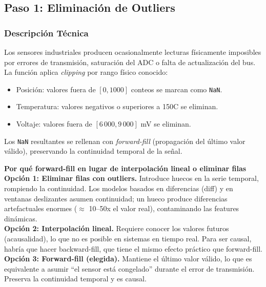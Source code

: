 \documentclass[12pt,a4paper]{article}
\begin{document}
\subsection{Paso 1: Eliminaci\'{o}n de Outliers}

\subsubsection{Descripci\'{o}n T\'{e}cnica}

Los sensores industriales producen ocasionalmente lecturas f\'{i}sicamente imposibles
por errores de transmisi\'{o}n, saturaci\'{o}n del ADC o falta de actualizaci\'{o}n del bus.
La funci\'{o}n aplica \textit{clipping} por rango f\'{i}sico conocido:
\begin{itemize}[itemsep=2pt]
  \item Posici\'{o}n: valores fuera de $[0, 1000]$ conteos se marcan como \texttt{NaN}.
  \item Temperatura: valores negativos o superiores a 150\textdegree{}C se eliminan.
  \item Voltaje: valores fuera de $[6\,000, 9\,000]$ mV se eliminan.
\end{itemize}
Los \texttt{NaN} resultantes se rellenan con \textit{forward-fill} (propagaci\'{o}n del
\'{u}ltimo valor v\'{a}lido), preservando la continuidad temporal de la se\~{n}al.

\begin{porquebox}
\textbf{Por qu\'{e} forward-fill en lugar de interpolaci\'{o}n lineal o eliminar filas}\\[4pt]
\textbf{Opci\'{o}n 1: Eliminar filas con outliers.} Introduce huecos en la serie
temporal, rompiendo la continuidad. Los modelos basados en diferencias (diff) y en
ventanas deslizantes asumen continuidad; un hueco produce diferencias artefactuales
enormes ($\approx$ 10--50x el valor real), contaminando las features din\'{a}micas.\\[4pt]
\textbf{Opci\'{o}n 2: Interpolaci\'{o}n lineal.} Requiere conocer los valores futuros
(acausalidad), lo que no es posible en sistemas en tiempo real. Para ser causal,
habr\'{i}a que hacer backward-fill, que tiene el mismo efecto pr\'{a}ctico que forward-fill.\\[4pt]
\textbf{Opci\'{o}n 3: Forward-fill (elegida).} Mantiene el \'{u}ltimo valor v\'{a}lido,
lo que es equivalente a asumir ``el sensor est\'{a} congelado'' durante el error de
transmisi\'{o}n. Preserva la continuidad temporal y es causal.
\end{porquebox}
\end{document}
